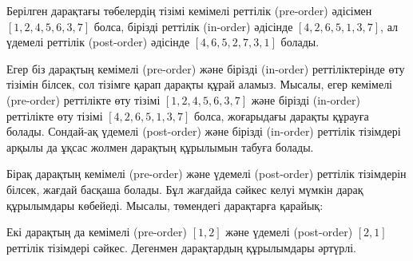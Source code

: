 Берілген дарақтағы төбелердің тізімі кемімелі реттілік (pre-order) әдісімен
$[1,2,4,5,6,3,7]$ болса, бірізді реттілік (in-order) әдісінде 
$[4,2,6,5,1,3,7]$, ал үдемелі реттілік (post-order) әдісінде $[4,6,5,2,7,3,1]$
болады.

Егер біз дарақтың кемімелі (pre-order) және бірізді (in-order) реттіліктерінде өту
тізімін білсек, сол тізімге қарап
дарақты құрай аламыз.
Мысалы, егер кемімелі (pre-order) реттілікте өту тізімі $[1,2,4,5,6,3,7]$ және бірізді (in-order) реттілікте өту тізімі 
$[4,2,6,5,1,3,7]$ болса, жоғарыдағы дарақты құрауға болады.
Сондай-ақ үдемелі (post-order) және бірізді (in-order) реттілік тізімдері арқылы да ұқсас жолмен
дарақтың құрылымын табуға болады.

Бірақ дарақтың кемімелі (pre-order) және үдемелі (post-order) реттілік тізімдерін білсек,
жағдай басқаша болады.
Бұл жағдайда сәйкес келуі мүмкін дарақ құрылымдары көбейеді.
Мысалы, төмендегі дарақтарға қарайық:
\begin{center}
\end{center}
Екі дарақтың да кемімелі (pre-order) $[1,2]$ және үдемелі (post-order) $[2,1]$ реттілік тізімдері сәйкес.
Дегенмен дарақтардың құрылымдары әртүрлі.

